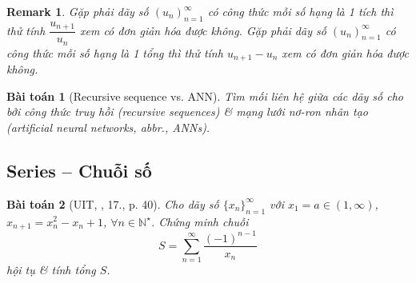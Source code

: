 \documentclass{article}
\newtheorem{baitoan}{Bài toán}
\newtheorem{remark}{Remark}
\begin{document}
\begin{remark}
	Gặp phải dãy số $(u_n)_{n=1}^\infty$ có công thức mỗi số hạng là 1 tích thì thử tính $\dfrac{u_{n+1}}{u_n}$ xem có đơn giản hóa được không. Gặp phải dãy số $(u_n)_{n=1}^\infty$ có công thức mỗi số hạng là 1 tổng thì thử tính $u_{n+1} - u_n$ xem có đơn giản hóa được không.
\end{remark}

\begin{baitoan}[Recursive sequence vs. ANN]
	Tìm mối liên hệ giữa các dãy số cho bởi công thức truy hồi (recursive sequences) \& mạng lưới nơ-ron nhân tạo (artificial neural networks, abbr., ANNs).
\end{baitoan}


\subsection{Series -- Chuỗi số}

\begin{baitoan}[UIT, \cite{VMS_VMC2025}, 17., p. 40]
	Cho dãy số $\{x_n\}_{n=1}^\infty$ với $x_1 = a\in(1,\infty)$, $x_{n+1} = x_n^2 - x_n + 1$, $\forall n\in\mathbb{N}^\star$. Chứng minh chuỗi
	\begin{equation*}
		S = \sum_{n=1}^\infty \frac{(-1)^{n-1}}{x_n}
	\end{equation*}
	hội tụ \& tính tổng $S$.
\end{baitoan}
\end{document}
